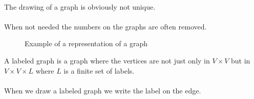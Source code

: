 \paragraph{}
The drawing of a graph is obviously not unique.

\paragraph{}
When not needed the numbers on the graphs are often removed.


\begin{figure}[H]
  \begin{center}
    \caption{Example of a representation of a graph}
  \end{center}
\end{figure}

\begin{definition}
  A labeled graph is a graph where the vertices are not just only in $V \times V$ but in $V \times V \times L$ where $L$ is a finite set of labels.
\end{definition}

\paragraph{}
When we draw a labeled graph we write the label on the edge.

